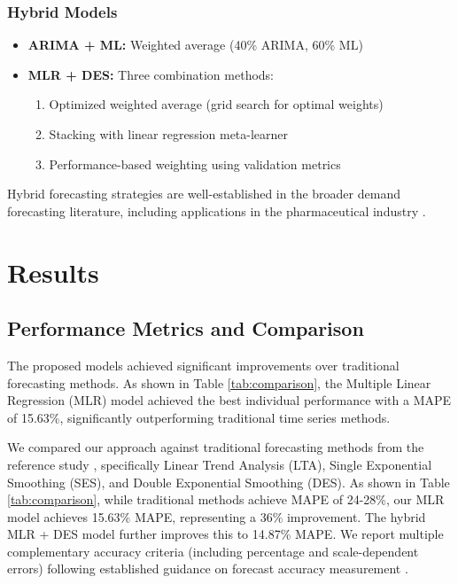 \documentclass[conference]{IEEEtran}
\begin{document}
\subsubsection{Hybrid Models}
\begin{itemize}
    \item \textbf{ARIMA + ML:} Weighted average (40\% ARIMA, 60\% ML)
    \item \textbf{MLR + DES:} Three combination methods:
    \begin{enumerate}
        \item Optimized weighted average (grid search for optimal weights)
        \item Stacking with linear regression meta-learner
        \item Performance-based weighting using validation metrics
    \end{enumerate}
\end{itemize}

Hybrid forecasting strategies are well-established in the broader demand forecasting literature, including applications in the pharmaceutical industry \cite{b19}.

\section{Results}

\subsection{Performance Metrics and Comparison}

The proposed models achieved significant improvements over traditional forecasting methods. As shown in Table \ref{tab:comparison}, the Multiple Linear Regression (MLR) model achieved the best individual performance with a MAPE of 15.63\%, significantly outperforming traditional time series methods.

We compared our approach against traditional forecasting methods from the reference study \cite{b1}, specifically Linear Trend Analysis (LTA), Single Exponential Smoothing (SES), and Double Exponential Smoothing (DES). As shown in Table \ref{tab:comparison}, while traditional methods achieve MAPE of 24-28\%, our MLR model achieves 15.63\% MAPE, representing a 36\% improvement. The hybrid MLR + DES model further improves this to 14.87\% MAPE. We report multiple complementary accuracy criteria (including percentage and scale-dependent errors) following established guidance on forecast accuracy measurement \cite{b11}.
\end{document}
